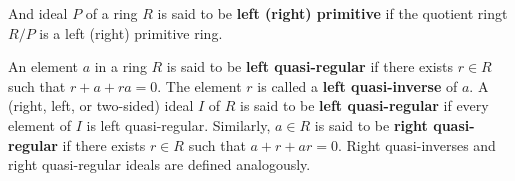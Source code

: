 \documentclass[11pt]{article}
\newenvironment{definition}[1][Definition]{\begin{trivlist}
\item[\hskip \labelsep {\bfseries #1}]}{\end{trivlist}}
\begin{document}
\begin{definition}
And ideal $P$ of a ring $R$ is said to be \textbf{left (right) primitive} if the quotient ringt $R/P$ is a left (right) primitive ring.
\end{definition}

\begin{definition}
An element $a$ in a ring $R$ is said to be \textbf{left quasi-regular} if there exists $r \in R$ such that $r + a + ra = 0$.
The element $r$ is called a \textbf{left quasi-inverse} of $a$.
A (right, left, or two-sided) ideal $I$ of $R$ is said to be \textbf{left quasi-regular} if every element of $I$ is left quasi-regular.
Similarly, $a \in R$ is said to be \textbf{right quasi-regular} if there exists $r \in R$ such that $a + r + ar = 0$.
Right quasi-inverses and right quasi-regular ideals are defined analogously.
\end{definition}
\end{document}
